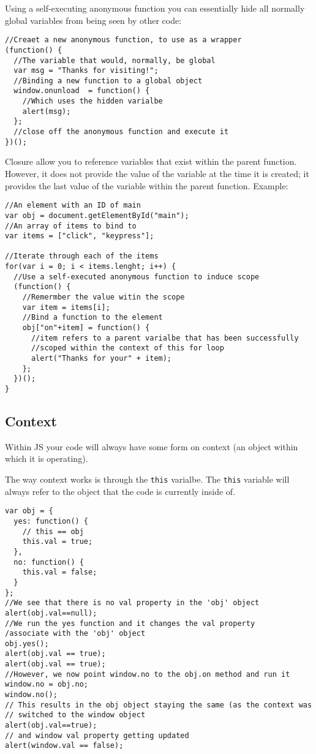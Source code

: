 \documentclass[a4paper,11pt]{book}
\begin{document}
Using a self-executing anonymous function you can essentially hide all normally
global variables from being seen by other code:
\begin{verbatim}
//Creaet a new anonymous function, to use as a wrapper
(function() {
  //The variable that would, normally, be global
  var msg = "Thanks for visiting!";
  //Binding a new function to a global object
  window.onunload  = function() {
    //Which uses the hidden varialbe
    alert(msg);
  };
  //close off the anonymous function and execute it
})();
\end{verbatim}
Closure allow you to reference variables that exist within the parent function.
However, it does not provide the value of the variable at the time it is
created; it provides the last value of the variable within the parent function. 
Example:
\begin{verbatim}
//An element with an ID of main
var obj = document.getElementById("main");
//An array of items to bind to
var items = ["click", "keypress"];

//Iterate through each of the items
for(var i = 0; i < items.lenght; i++) {
  //Use a self-executed anonymous function to induce scope
  (function() {
    //Remermber the value witin the scope
    var item = items[i];
    //Bind a function to the element
    obj["on"+item] = function() {
      //item refers to a parent varialbe that has been successfully
      //scoped within the context of this for loop
      alert("Thanks for your" + item);
    };
  })();
}
\end{verbatim}
\subsection{Context}
Within JS your code will always have some form on context (an object within
which it is operating). 

The way context works is through the \verb|this| varialbe. The \verb|this|
variable will always refer to the object that the code is currently inside of.
\begin{verbatim}
var obj = {
  yes: function() {
    // this == obj
    this.val = true;
  },
  no: function() {
    this.val = false;
  }
};
//We see that there is no val property in the 'obj' object
alert(obj.val==null);
//We run the yes function and it changes the val property
/associate with the 'obj' object
obj.yes();
alert(obj.val == true);
alert(obj.val == true);
//However, we now point window.no to the obj.on method and run it
window.no = obj.no;
window.no();
// This results in the obj object staying the same (as the context was
// switched to the window object
alert(obj.val==true);
// and window val property getting updated
alert(window.val == false);
\end{verbatim}
\end{document}
